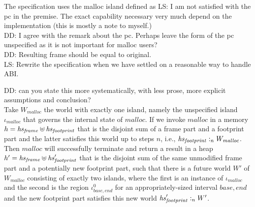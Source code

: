 \documentclass{article}
\newcommand\lau[1]{{\color{purple} \sf \footnotesize {LS: #1}}\\}
\newcommand\dominique[1]{{\color{purple} \sf \footnotesize {DD: #1}}\\}
\newcommand{\var}[1]{\mathit{#1}}
\newcommand{\heap}{\var{heap}}
\newcommand{\heapSat}[3][\heap]{#1 :_{#2} #3}
\newcommand{\codelabel}[1]{\mathit{#1}}
\newcommand{\malloc}{\codelabel{malloc}}
\begin{document}
The specification uses the malloc island defined as
\lau{I am not satisfied with the pc in the premise. The exact capability necessary very much depend on the implementation (this is mostly a note to myself.)}
\dominique{I agree with the remark about the pc.  Perhaps leave the form of the
  pc unspecified as it is not important for malloc users?}
\dominique{Resulting frame should be equal to original.}
\lau{Rewrite the specification when we have settled on a reasonable way to handle ABI.}

\begin{specification}[Malloc]\dominique{can you state this more systematically, with less prose, more explicit assumptions and conclusion?}
Take $W_{\malloc}$ the world with exactly one island, namely the unspecified island $\iota_{\malloc}$ that governs the internal state of $\malloc$.  If we invoke $\malloc$ in a memory $h = \hsframe \uplus \hsfoot$
that is the disjoint sum of a frame part and a footprint part and the latter satisfies this world up to steps $n$, i.e., $\heapSat[\hsfoot]{n}{W_{\malloc}}$. Then $\malloc$ will successfully terminate and return a result in a heap $h' = \hsframe \uplus \hsfoot'$ that is the disjoint sum of the same unmodified frame part and a potentially new footprint part, such that there is a future world $W'$ of $W_{\malloc}$ consisting of exactly two islands, where the first is an instance of $\iota_{\malloc}$ and the second is the region $\iota_{\var{base},\var{end}}^0$
 for an appropriately-sized interval $\var{base},\var{end}$ and the new footprint part satisfies this new world $\heapSat[\hsfoot']{n}{W'}$. 


\end{specification}
\end{document}
